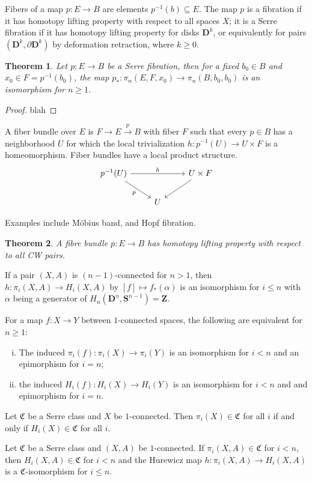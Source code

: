 \documentclass[11pt]{article}
\theoremstyle{definition}
\theoremstyle{plain}
\newtheorem{theorem}{Theorem}[section]
\newcommand{\Z}{\mathbf{Z}}
\newcommand{\1}{\mathbf{1}}
\newcommand{\s}{\mathbf{S}}
\begin{document}
Fibers of a map $p:E\to B$ are elements $p^{-1}(b)\subseteq E$. The map $p$ is a fibration if it has homotopy lifting property with respect to all spaces $X$; it is a Serre fibration if it has homotopy lifting property for disks $\mathbf{D}^k$, or equivalently for pairs $(\mathbf{D}^k,\partial\mathbf{D}^k)$ by deformation retraction, where $k\geq0$.

\begin{theorem}
Let $p:E\to B$ be a Serre fibration, then for a fixed $b_0\in B$ and $x_0\in F=p^{-1}(b_0)$, the map $p_\ast:\pi_n(E,F,x_0)\to\pi_n(B,b_0,b_0)$ is an isomorphism for $n\geq1$.
\end{theorem}
\begin{proof}
blah
\end{proof}

A fiber bundle over $E$ is $F\to E\xrightarrow{p}B$ with fiber $F$ such that every $p\in B$ has a neighborhood $U$ for which the local trivialization $h:p^{-1}(U)\to U\times F$ is a homeomorphism. Fiber bundles have a local product structure.
\[\begin{tikzcd}
p^{-1}(U)\arrow[swap]{dr}{p}\arrow{rr}{h}&&U\times F\arrow[dl]\\
&U
\end{tikzcd}\]\medbreak

Examples include Möbius band, and Hopf fibration.

\begin{theorem}
A fibre bundle $p:E\to B$ has homotopy lifting property with respect to all CW pairs.
\end{theorem}

\begin{thm}[Hurewicz]
If a pair $(X,A)$ is $(n-1)$-connected for $n>1$, then $h:\pi_i(X,A)\to H_i(X,A)$ by $[f]\mapsto f_\ast(\alpha)$ is an isomorphism for $i\leq n$ with $\alpha$ being a generator of $H_n(\mathbf{D}^n,\s^{n-1})=\Z$.
\end{thm}

\begin{thm}[Whitehead]
For a map $f:X\to Y$ between $1$-connected spaces, the following are equivalent for $n\geq1$:\begin{enumerate}[(i)]
    \item The induced $\pi_i(f):\pi_i(X)\to\pi_i(Y)$ is an isomorphism for $i<n$ and an epimorphism for $i=n$;
    \item the induced $H_i(f):H_i(X)\to H_i(Y)$ is an isomorphism for $i<n$ and and epimorphism for $i=n$.
\end{enumerate}
\end{thm}

\begin{lem}
Let $\mathfrak{C}$ be a Serre class and $X$ be $1$-connected. Then $\pi_i(X)\in\mathfrak{C}$ for all $i$ if and only if $H_i(X)\in\mathfrak{C}$ for all $i$.
\end{lem}

\begin{thm}
Let $\mathfrak{C}$ be a Serre class and $(X,A)$ be $1$-connected. If $\pi_i(X,A)\in\mathfrak{C}$ for $i<n$, then $H_i(X,A)\in\mathfrak{C}$ for $i<n$ and the Hurewicz map $h:\pi_i(X,A)\to H_i(X,A)$ is a $\mathfrak{C}$-isomorphism for $i\leq n$.
\end{thm}
\end{document}
